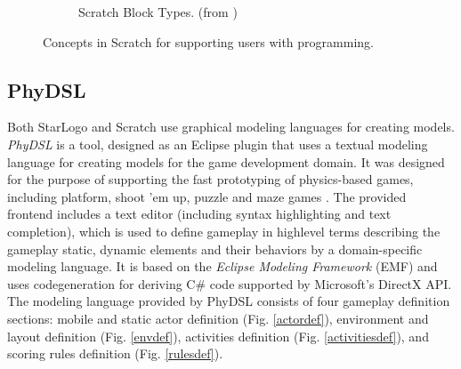 \documentclass[runningheads,a4paper]{llncs}
\begin{document}
\begin{figure}[ht]
\begin{subfigure}[t]{0.9\textwidth}
\caption{Scratch Block Types. (from \cite{maloney2010scratch})}\end{subfigure}
\caption{Concepts in Scratch for supporting users with programming.}
\end{figure}

  \subsection{PhyDSL}
  Both StarLogo and Scratch use graphical modeling languages for creating models. 
  \emph{PhyDSL} is a tool, designed as an Eclipse plugin that uses a textual modeling language for creating models for the game development domain.
  It was designed for the purpose of supporting the fast prototyping of physics-based games, including platform, shoot ’em up, 
  puzzle and maze games \cite{guana2014phydsl}. 
  The provided frontend includes a text editor (including syntax highlighting and text completion), which is used to define gameplay in highlevel
  terms describing the gameplay static, dynamic elements and their behaviors by a domain-specific modeling language.  
  It is based on the \emph{Eclipse Modeling Framework}\cite{gronback2009eclipse} (EMF) and uses codegeneration for deriving C\# code supported by Microsoft’s
  DirectX API. 
  The modeling language provided by PhyDSL consists of four gameplay definition sections: mobile and
  static actor definition (Fig. \ref{actordef}), 
  environment and layout definition (Fig. \ref{envdef}), 
  activities definition (Fig. \ref{activitiesdef}), 
  and scoring rules definition (Fig. \ref{rulesdef}).
  
\end{document}
